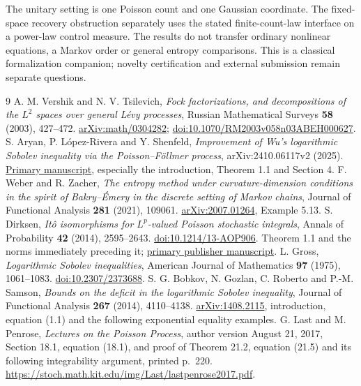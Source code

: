 \documentclass[11pt]{article}
\begin{document}
The unitary setting is one Poisson count and one Gaussian coordinate. The fixed-space recovery obstruction separately uses the stated finite-count-law interface on a power-law control measure. The results
do not transfer ordinary nonlinear equations, a Markov order or general
entropy comparisons. This is a classical formalization companion;
novelty certification and external submission remain separate questions.

{\small
\begin{thebibliography}{9}
 A. M. Vershik and N. V. Tsilevich,
\emph{Fock factorizations, and decompositions of the $L^2$ spaces over
general L\'evy processes}, Russian Mathematical Surveys \textbf{58}
(2003), 427--472.
\href{https://arxiv.org/abs/math/0304282}{arXiv:math/0304282};
\href{https://doi.org/10.1070/RM2003v058n03ABEH000627}{doi:10.1070/RM2003v058n03ABEH000627}.
 S. Aryan, P. L\'opez-Rivera and Y. Shenfeld,
\emph{Improvement of Wu's logarithmic Sobolev inequality via the
Poisson--F\"ollmer process}, arXiv:2410.06117v2 (2025).
\href{https://arxiv.org/abs/2410.06117v2}{Primary manuscript},
especially the introduction, Theorem 1.1 and Section 4.
 F. Weber and R. Zacher,
\emph{The entropy method under curvature-dimension conditions in the
spirit of Bakry--\'Emery in the discrete setting of Markov chains},
Journal of Functional Analysis \textbf{281} (2021), 109061.
\href{https://arxiv.org/abs/2007.01264}{arXiv:2007.01264}, Example 5.13.
 S. Dirksen,
\emph{It\^o isomorphisms for $L^p$-valued Poisson stochastic integrals},
Annals of Probability \textbf{42} (2014), 2595--2643.
\href{https://doi.org/10.1214/13-AOP906}{doi:10.1214/13-AOP906}.
Theorem 1.1 and the norms immediately preceding it;
\href{https://research-portal.uu.nl/ws/files/107833782/13_AOP906.pdf}{primary publisher manuscript}.
 L. Gross,
\emph{Logarithmic Sobolev inequalities}, American Journal of Mathematics
\textbf{97} (1975), 1061--1083.
\href{https://doi.org/10.2307/2373688}{doi:10.2307/2373688}.
 S. G. Bobkov, N. Gozlan, C. Roberto and P.-M. Samson,
\emph{Bounds on the deficit in the logarithmic Sobolev inequality},
Journal of Functional Analysis \textbf{267} (2014), 4110--4138.
\href{https://arxiv.org/abs/1408.2115}{arXiv:1408.2115}, introduction,
equation (1.1) and the following exponential equality examples.
 G. Last and M. Penrose,
\emph{Lectures on the Poisson Process}, author version August 21, 2017,
Section 18.1, equation (18.1), and proof of Theorem 21.2,
equation (21.5) and its following integrability argument, printed p.~220.
\url{https://stoch.math.kit.edu/img/Last/lastpenrose2017.pdf}.
\end{thebibliography}
}
\end{document}
